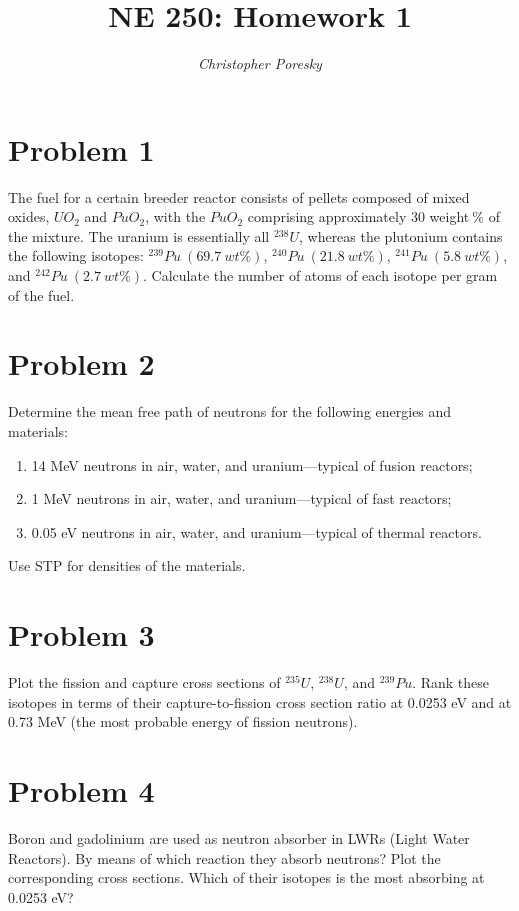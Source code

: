 \documentclass{article}
\author{\textit {Christopher Poresky}}
\title{\textbf {NE 250: Homework 1}}
\begin{document}
\maketitle
\section*{Problem 1}

The fuel for a certain breeder reactor consists of pellets composed of mixed oxides, $UO_{2}$ and
$PuO_{2}$, with the $PuO_{2}$ comprising approximately 30 weight$~\%$ of the mixture. The uranium is
essentially all $^{238}U$, whereas the plutonium contains the following isotopes: $^{239}Pu~(69.7~wt\%)$,
$^{240}Pu~(21.8~wt\%)$, $^{241}Pu~(5.8~wt\%)$, and $^{242}Pu~(2.7~wt\%)$. Calculate the number of atoms of
each isotope per gram of the fuel.

\section*{Problem 2}

Determine the mean free path of neutrons for the following energies and materials:

\begin{enumerate}[label=(\alph*)]
\item 14 MeV neutrons in air, water, and uranium—typical of fusion reactors;
\item 1 MeV neutrons in air, water, and uranium—typical of fast reactors;
\item 0.05 eV neutrons in air, water, and uranium—typical of thermal reactors.
\end{enumerate}

Use STP for densities of the materials.

\section*{Problem 3}

Plot the fission and capture cross sections of $^{235}U$, $^{238}U$, and $^{239}Pu$. Rank these isotopes in
terms of their capture-to-fission cross section ratio at 0.0253 eV and at 0.73 MeV (the most
probable energy of fission neutrons).

\section*{Problem 4}

Boron and gadolinium are used as neutron absorber in LWRs (Light Water Reactors). By
means of which reaction they absorb neutrons? Plot the corresponding cross sections. Which
of their isotopes is the most absorbing at 0.0253 eV?
\end{document}
